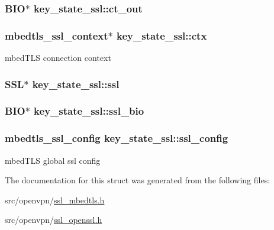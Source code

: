 \subsubsection[{ct\+\_\+out}]{\setlength{\rightskip}{0pt plus 5cm}B\+I\+O$\ast$ key\+\_\+state\+\_\+ssl\+::ct\+\_\+out}\label{structkey__state__ssl_aaeae666ec95965ee25625664e2963618}
\hypertarget{structkey__state__ssl_aa9227f00c4139a321564b3ba1e7e4f93}{}
\subsubsection[{ctx}]{\setlength{\rightskip}{0pt plus 5cm}mbedtls\+\_\+ssl\+\_\+context$\ast$ key\+\_\+state\+\_\+ssl\+::ctx}\label{structkey__state__ssl_aa9227f00c4139a321564b3ba1e7e4f93}
mbed\+T\+L\+S connection context \hypertarget{structkey__state__ssl_a57b7d5c0e8e97b59ce9cdb84e13e547f}{}
\subsubsection[{ssl}]{\setlength{\rightskip}{0pt plus 5cm}S\+S\+L$\ast$ key\+\_\+state\+\_\+ssl\+::ssl}\label{structkey__state__ssl_a57b7d5c0e8e97b59ce9cdb84e13e547f}
\hypertarget{structkey__state__ssl_a8f5a44beeee25a840aeb7066f3f67872}{}
\subsubsection[{ssl\+\_\+bio}]{\setlength{\rightskip}{0pt plus 5cm}B\+I\+O$\ast$ key\+\_\+state\+\_\+ssl\+::ssl\+\_\+bio}\label{structkey__state__ssl_a8f5a44beeee25a840aeb7066f3f67872}
\hypertarget{structkey__state__ssl_af07b31e4dab76acec3ea7420e66a3bf2}{}
\subsubsection[{ssl\+\_\+config}]{\setlength{\rightskip}{0pt plus 5cm}mbedtls\+\_\+ssl\+\_\+config key\+\_\+state\+\_\+ssl\+::ssl\+\_\+config}\label{structkey__state__ssl_af07b31e4dab76acec3ea7420e66a3bf2}
mbed\+T\+L\+S global ssl config 

The documentation for this struct was generated from the following files\+:\begin{DoxyCompactItemize}
\item 
src/openvpn/\hyperlink{ssl__mbedtls_8h}{ssl\+\_\+mbedtls.\+h}\item 
src/openvpn/\hyperlink{ssl__openssl_8h}{ssl\+\_\+openssl.\+h}\end{DoxyCompactItemize}

